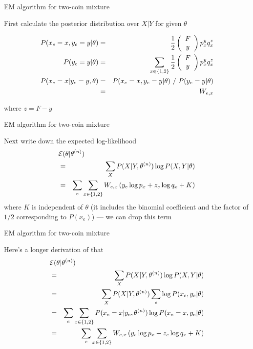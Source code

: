 \documentclass{beamer}
\begin{document}
\begin{frame}{EM algorithm for two-coin mixture}

First calculate the posterior distribution over $X|Y$ for given $\theta$

\begin{eqnarray*}
P(x_e=x,y_e=y|\theta) & = & \frac{1}{2} \left( \begin{array}{c} F \\ y \end{array} \right) p_x^y q_x^z \\
P(y_e=y|\theta) & = & \sum_{x \in \{1,2\}} \frac{1}{2} \left( \begin{array}{c} F \\ y \end{array} \right) p_x^y q_x^z \\
P(x_e=x|y_e=y,\theta) & = & P(x_e=x,y_e=y|\theta)\ /\ P(y_e=y|\theta) \\
& = & W_{e,x}
\end{eqnarray*}

where $z = F - y$

\end{frame}

\begin{frame}{EM algorithm for two-coin mixture}

Next write down the expected log-likelihood
\begin{eqnarray*}
\lefteqn{{\cal E}(\theta|\theta^{(n)})} \\
& = & \sum_X P(X|Y,\theta^{(n)}) \log P(X,Y|\theta) \\
& = & \sum_e \sum_{x \in \{1,2\}} W_{e,x} \left( y_e \log p_x + z_e \log q_x + K \right)
\end{eqnarray*}
where $K$ is independent of $\theta$
(it includes the binomial coefficient and the factor of $1/2$ corresponding to $P(x_e)$)
--- we can drop this term

\end{frame}

\begin{frame}{EM algorithm for two-coin mixture}

Here's a longer derivation of that
\begin{eqnarray*}
\lefteqn{{\cal E}(\theta|\theta^{(n)})} \\
& = & \sum_X P(X|Y,\theta^{(n)}) \log P(X,Y|\theta) \\
& = & \sum_X P(X|Y,\theta^{(n)}) \sum_e \log P(x_e,y_e|\theta) \\
& = & \sum_e \sum_{x \in \{1,2\}} P(x_e=x|y_e,\theta^{(n)})  \log P(x_e=x,y_e|\theta) \\
& = & \sum_e \sum_{x \in \{1,2\}} W_{e,x} \left( y_e \log p_x + z_e \log q_x + K \right)
\end{eqnarray*}

\end{frame}
\end{document}
